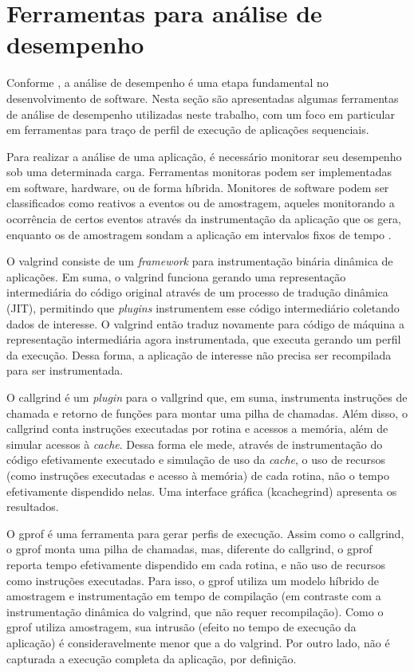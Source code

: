 \documentclass[cic,tc]{iiufrgs}
\begin{document}
\section{Ferramentas para análise de desempenho}
\label{sec:antanal}

Conforme \cite{jain2art}, a análise de desempenho é uma etapa fundamental no
desenvolvimento de software. Nesta seção são apresentadas algumas ferramentas
de análise de desempenho utilizadas neste trabalho, com um foco em particular
em ferramentas para traço de perfil de execução de aplicações sequenciais.

Para realizar a análise de uma aplicação, é necessário monitorar seu desempenho
sob uma determinada carga. Ferramentas monitoras podem ser implementadas em
software, hardware, ou de forma híbrida. Monitores de software podem ser
classificados como reativos a eventos ou de amostragem, aqueles monitorando a
ocorrência de certos eventos através da instrumentação da aplicação que os
gera, enquanto os de amostragem sondam a aplicação em intervalos fixos de
tempo \cite{jain2art}.

O valgrind \cite{nethercote2007valgrind} consiste de um \textit{framework} para
instrumentação binária dinâmica de aplicações. Em suma, o valgrind funciona
gerando uma representação intermediária do código original através de um
processo de tradução dinâmica (JIT), permitindo que \textit{plugins}
instrumentem esse código intermediário coletando dados de interesse. O valgrind
então traduz novamente para código de máquina a representação intermediária
agora instrumentada, que executa gerando um perfil da execução. Dessa forma, a
aplicação de interesse não precisa ser recompilada para ser instrumentada.

O callgrind \cite{weidendorfer2008sequential} é um \textit{plugin} para o
vallgrind que, em suma, instrumenta instruções de chamada e retorno de funções
para montar uma pilha de chamadas. Além disso, o callgrind conta instruções
executadas por rotina e acessos a memória, além de simular acessos à \textit{cache}.
Dessa forma ele mede, através de instrumentação do código efetivamente
executado e simulação de uso da \textit{cache}, o uso de recursos (como instruções
executadas e acesso à memória) de cada rotina, não o tempo efetivamente
dispendido nelas. Uma interface gráfica (kcachegrind) apresenta os resultados.

O gprof \cite{graham1982gprof} é uma ferramenta para gerar perfis de execução.
Assim como o callgrind, o gprof monta uma pilha de chamadas, mas, diferente do
callgrind, o gprof reporta tempo efetivamente dispendido em cada rotina, e não
uso de recursos como instruções executadas. Para isso, o gprof utiliza um
modelo híbrido de amostragem e instrumentação em tempo de compilação (em
contraste com a instrumentação dinâmica do valgrind, que não requer
recompilação). Como o gprof utiliza amostragem, sua intrusão (efeito no tempo
de execução da aplicação) é consideravelmente menor que a do valgrind. Por
outro lado, não é capturada a execução completa da aplicação, por definição.
\end{document}
